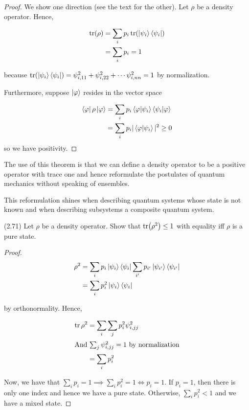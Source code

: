 \documentclass[main.tex]{subfiles}
\begin{document}
\begin{subappendices}
\begin{theorem}
\begin{proof}
	We show one direction (see the text for the other). Let $\rho$ be a density operator. Hence,
	
	\begin{align*}
	\tr(\rho) &= \sum_i p_i \tr(\ket{\psi_i}\bra{\psi_i}) \\
	&= 	\sum_i p_i =1
	\end{align*}

because $\tr(\ket{\psi_i}\bra{\psi_i}) = \psi_{i, 11}^2 + \psi_{i, 22}^2 + \cdots \psi_{i, nn}^2 = 1$ by normalization. 

Furthermore, suppose $\ket{\varphi}$ resides in the vector space

\begin{align*}
\bra{\varphi} \rho \ket{\varphi} &= \sum_i p_i \bra{\varphi}\ket{\psi_i}\bra{\psi_i}\ket{\varphi} \\
&= \sum_i p_i |\bra{\varphi}\ket{\psi_i}|^2 \geq 0
\end{align*}
so we have positivity.
\end{proof}	
\end{theorem}

The use of this theorem is that we can define a density operator to be a positive operator with trace one and hence reformulate the postulates of quantum mechanics without speaking of ensembles.

This reformulation shines when describing quantum systems whose state is not known and when describing subsystems a composite quantum system.

\begin{exercise}
(2.71) Let $\rho$ be a density operator. Show that $\tr(\rho^2) \leq 1$ with equality iff $\rho$ is a pure state.
\begin{proof}
\begin{align*}
\rho^2 &= \sum_i p_i \ket{\psi_i}\bra{\psi_i}	\sum_{i'} p_{i'} \ket{\psi_{i'}}\bra{\psi_{i'}}	\\
&= 	\sum_i p_i^2 \ket{\psi_i}\bra{\psi_i}
\end{align*}

by orthonormality. Hence,

\begin{align*}
\tr \rho^2 &= \sum_i \sum_j p_i^2 \psi_{i,jj}^2 \\
\intertext{And $\sum_j \psi_{i,jj}^2=1$ by normalization}
&= \sum_i p_i^2
\end{align*}

Now, we have that $\sum_i p_i = 1 \implies \sum_i p_i^2 = 1 \iff p_i = 1$. If $p_i = 1$, then there is only one index and hence we have a pure state. Otherwise, $\sum_i p_i^2 < 1$ and we have a mixed state.
\end{proof}	
\end{exercise}


\end{subappendices}
\end{document}
